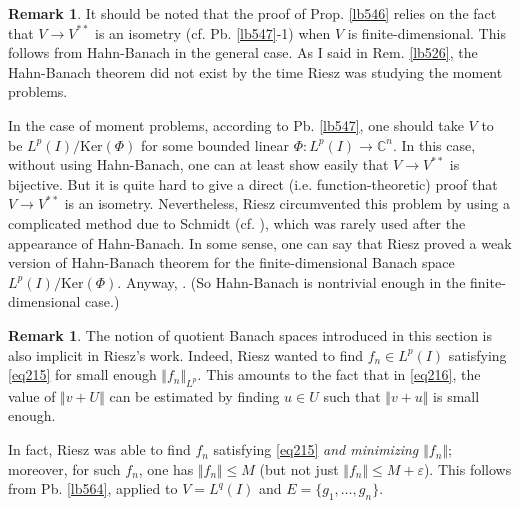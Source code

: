 \documentclass[12pt,b5paper,notitlepage]{article}
\theoremstyle{definition}
\newtheorem{rem}[df]{Remark}
\theoremstyle{plain}
\newcommand{\Cbb}{\mathbb C}
\newcommand{\Ker}{\mathrm{Ker}}
\newcommand{\eps}{\varepsilon}
\numberwithin{equation}{section}
\begin{document}
\begin{rem}
It should be noted that the proof of Prop. \ref{lb546} relies on the fact that $V\rightarrow V^{**}$ is an isometry (cf. Pb. \ref{lb547}-1) when $V$ is finite-dimensional. This follows from Hahn-Banach in the general case. As I said in Rem. \ref{lb526}, the Hahn-Banach theorem did not exist by the time Riesz was studying the moment problems.

In the case of moment problems, according to Pb. \ref{lb547}, one should take $V$ to be $L^p(I)/\Ker(\Phi)$ for some bounded linear $\Phi:L^p(I)\rightarrow\Cbb^n$. In this case, without using Hahn-Banach, one can at least show easily that $V\rightarrow V^{**}$ is bijective. But it is quite hard to give a direct (i.e. function-theoretic) proof that $V\rightarrow V^{**}$ is an isometry.  Nevertheless, Riesz circumvented this problem by using a complicated method due to Schmidt (cf. \cite[Sec. 6.2 and 5.3]{Die-H}), which was rarely used after the appearance of Hahn-Banach. In some sense, one can say that Riesz proved a weak version of Hahn-Banach theorem for the finite-dimensional Banach space $L^p(I)/\Ker(\Phi)$. Anyway, . (So Hahn-Banach is nontrivial enough in the finite-dimensional case.) %
\hfill\qedsymbol
\end{rem}

\begin{rem}
The notion of quotient Banach spaces introduced in this section is also implicit in Riesz's work. Indeed, Riesz wanted to find $f_n\in L^p(I)$ satisfying \eqref{eq215} for small enough $\Vert f_n\Vert_{L^p}$. This amounts to the fact that in \eqref{eq216}, the value of  $\Vert v+U\Vert$ can be estimated by finding $u\in U$ such that $\Vert v+u\Vert$ is small enough. 

In fact, Riesz was able to find $f_n$ satisfying \eqref{eq215} \textit{and minimizing $\Vert f_n\Vert$}; moreover, for such $f_n$, one has $\Vert f_n\Vert\leq M$ (but not just $\Vert f_n\Vert\leq M+\eps$). This follows from Pb. \ref{lb564}, applied to $V=L^q(I)$ and $E=\{g_1,\dots,g_n\}$.%
\hfill\qedsymbol
\end{rem}
\end{document}
